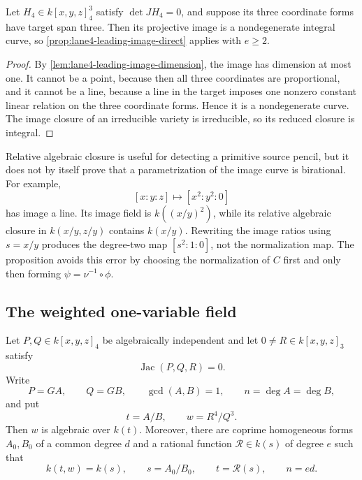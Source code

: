 \begin{corollary}
\label{cor:lane4-span-three-entry}
Let \(H_4\in k[x,y,z]_4^3\) satisfy \(\det JH_4=0\), and suppose its three
coordinate forms have target span three.  Then its projective image is a
nondegenerate integral curve, so
\cref{prop:lane4-leading-image-direct} applies with \(e\geq2\).
\end{corollary}

\begin{proof}
By \cref{lem:lane4-leading-image-dimension}, the image has dimension at most
one.  It cannot be a point, because then all three coordinates are
proportional, and it cannot be a line, because a line in the target imposes
one nonzero constant linear relation on the three coordinate forms.  Hence it
is a nondegenerate curve.  The image closure of an irreducible variety is
irreducible, so its reduced closure is integral.
\end{proof}

\begin{remark}
\label{rem:lane4-relative-closure-warning}
Relative algebraic closure is useful for detecting a primitive source
pencil, but it does not by itself prove that a parametrization of the image
curve is birational.  For example,
\[
 [x:y:z]\longmapsto[x^2:y^2:0]
\]
has image a line.  Its image field is
\(k((x/y)^2)\), while its relative algebraic closure in
\(k(x/y,z/y)\) contains \(k(x/y)\).  Rewriting the image ratios using
\(s=x/y\) produces the degree-two map \([s^2:1:0]\), not the normalization
map.  The proposition avoids this error by choosing the normalization of
\(C\) first and only then forming \(\psi=\nu^{-1}\circ\phi\).
\end{remark}

\subsection{The weighted one-variable field}

\begin{lemma}
\label{lem:lane4-weighted-field}
Let \(P,Q\in k[x,y,z]_4\) be algebraically independent and let
\(0\ne R\in k[x,y,z]_3\) satisfy
\[
 \operatorname{Jac}(P,Q,R)=0.
\]
Write
\[
 P=GA,\qquad Q=GB,\qquad \gcd(A,B)=1,\qquad
 n=\deg A=\deg B,
\]
and put
\[
 t=A/B,\qquad w=R^4/Q^3.
\]
Then \(w\) is algebraic over \(k(t)\).  Moreover, there are coprime
homogeneous forms \(A_0,B_0\) of a common degree \(d\) and a rational
function \(\mathcal R\in k(s)\) of degree \(e\) such that
\[
 k(t,w)=k(s),\qquad s=A_0/B_0,\qquad
 t=\mathcal R(s),\qquad n=ed.
\]
\end{lemma}

